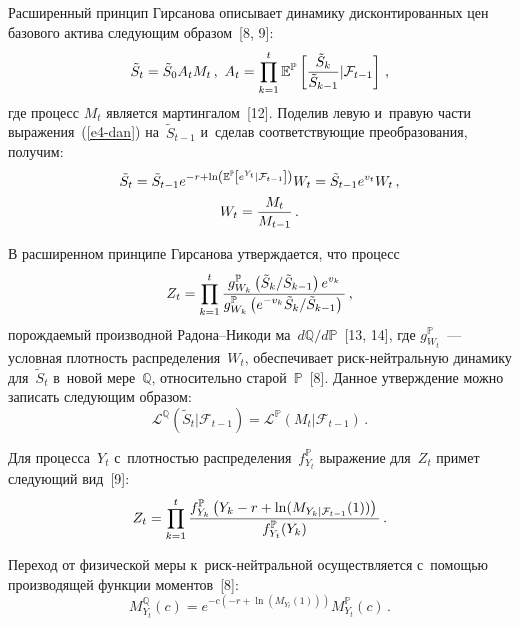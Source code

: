 \begin{multicols}{2}
  Расширенный принцип Гирсанова описывает динамику дисконтированных 
цен базового актива следующим образом~[8, 9]:
  \begin{equation}
  \tilde{S}_t=\tilde{S}_0 A_t M_t\,,\ A_t=\prod\limits^t_{k=1} 
\mathbb{E}^{\mathbb{P}} \left[ \displaystyle\frac{\displaystyle \tilde{S}_k\mathstrut}{\displaystyle \tilde{S}_{k-1}\mathstrut}\vert 
\mathcal{F}_{t-1}\right]\,,
  \label{e4-dan}
  \end{equation}
где процесс $M_t$ является мартингалом~[12]. Поделив левую и~правую части 
выражения~(\ref{e4-dan}) на~$\tilde{S}_{t-1}$ и~сделав соответствующие 
преобразования, получим:
\begin{multline*}
\tilde{S}_t=\tilde{S}_{t-1} e^{-r+\ln\left(\mathbb{E}^{\mathbb{P}}
\left[e^{Y_t}\vert 
\mathcal{F}_{t-1}\right]\right)} W_t =\tilde{S}_{t-1} e^{v_t} W_t\,,\\ 
W_t=\displaystyle\frac{\displaystyle M_t\mathstrut}{\displaystyle M_{t-1}\mathstrut}\,.
\end{multline*}
  
  В расширенном принципе Гирсанова утверждается, что процесс 
  $$
  Z_t= \prod\limits^t_{k=1} \displaystyle\frac{\displaystyle g_{W_k}^{\mathbb{P}}\left(\tilde{S}_k/
  \tilde{S}_{k-1}\right) e^{v_k}\mathstrut}{\displaystyle  g_{W_k}^{\mathbb{P}} \left(e^{-
v_k}\tilde{S}_k/\tilde{S}_{k-1}\right)\mathstrut}\,,
  $$ 
  порождаемый производной Ра\-до\-на--Ни\-ко\-ди\-
ма~$d\mathbb{Q}/d\mathbb{P}$~[13, 14], где $g_{W_t}^{\mathbb{P}}$~--- 
условная плот\-ность распределения~$W_t$, обеспечивает  
риск-нейт\-раль\-ную динамику для~$\tilde{S}_t$ в~новой мере~$\mathbb{Q}$, 
относительно старой~$\mathbb{P}$~[8]. Данное утверждение можно записать 
следующим образом:
$$
\mathcal{L}^{\mathbb{Q}}\left( \tilde{S}_t\vert 
\mathcal{F}_{t-1}\right)= \mathcal{L}^{\mathbb{P}}\left( M_t\vert 
\mathcal{F}_{t-1}\right)\,.
$$

 Для процесса~$Y_t$ с~плотностью 
распределения~$f_{Y_t}^{\mathbb{P}}$ выражение для~$Z_t$ примет 
следующий вид~[9]:
  \begin{equation*}
  Z_t= \prod\limits^t_{k=1} \displaystyle\frac{\displaystyle  f_{Y_k}^{\mathbb{P}} \left(Y_k-r+\ln 
(M_{Y_k\vert\mathcal{F}_{t-1}}(1))\right)\mathstrut}{\displaystyle f_{Y_t}^{\mathbb{P}}(Y_k)\mathstrut}\,.
  \end{equation*}
  
  Переход от физической меры к~риск-нейт\-раль\-ной осуществляется 
с~помощью производящей функции моментов~[8]:
  \begin{equation}
  M_{Y_t}^{\mathbb{Q}}(c)=e^{-c(-r+\ln(M_{Y_t}(1)))} 
M_{Y_t}^{\mathbb{P}}(c)\,.
  \label{e7-dan}
  \end{equation}
  

\end{multicols}

